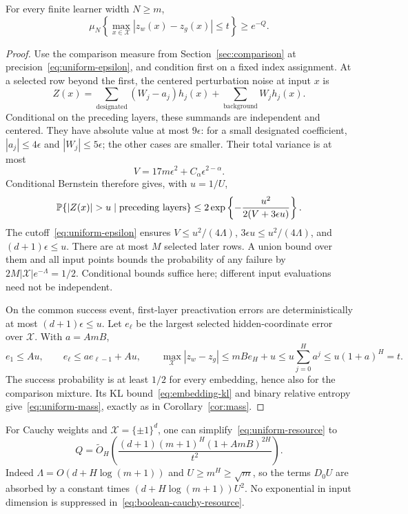 \begin{theorem}\label{thm:uniform-mass}
For every finite learner width $N\ge m$,
\begin{equation}
 \mu_N\left\{\max_{x\in\mathcal X}|z_w(x)-z_g(x)|\le t\right\}
 \ge e^{-Q}.
 \label{eq:uniform-mass}
\end{equation}
\end{theorem}
\begin{proof}
Use the comparison measure from Section~\ref{sec:comparison} at precision~\eqref{eq:uniform-epsilon}, and condition first on a fixed index assignment. At a selected row beyond the first, the centered perturbation noise at input $x$ is
\[
 Z(x)=\sum_{\mathrm{designated}}(W_j-a_j)h_j(x)
        +\sum_{\mathrm{background}}W_jh_j(x).
\]
Conditional on the preceding layers, these summands are independent and centered. They have absolute value at most $9\epsilon$: for a small designated coefficient, $|a_j|\le4\epsilon$ and $|W_j|\le5\epsilon$; the other cases are smaller. Their total variance is at most
\[
 V=17m\epsilon^2+C_\alpha\epsilon^{2-\alpha}.
\]
Conditional Bernstein therefore gives, with $u=1/U$,
\[
 \Pp\{|Z(x)|>u\mid\text{preceding layers}\}
 \le2\exp\left\{-\frac{u^2}{2(V+3\epsilon u)}\right\}.
\]
The cutoff~\eqref{eq:uniform-epsilon} ensures $V\le u^2/(4\Lambda)$, $3\epsilon u\le u^2/(4\Lambda)$, and $(d+1)\epsilon\le u$. There are at most $M$ selected later rows. A union bound over them and all input points bounds the probability of any failure by $2M|\mathcal X|e^{-\Lambda}=1/2$. Conditional bounds suffice here; different input evaluations need not be independent.

On the common success event, first-layer preactivation errors are deterministically at most $(d+1)\epsilon\le u$. Let $e_\ell$ be the largest selected hidden-coordinate error over $\mathcal X$. With $a=AmB$,
\[
 e_1\le Au,\qquad e_\ell\le ae_{\ell-1}+Au,\qquad
 \max_{\mathcal X}|z_w-z_g|\le mB e_H+u
 \le u\sum_{j=0}^H a^j\le u(1+a)^H=t.
\]
The success probability is at least $1/2$ for every embedding, hence also for the comparison mixture. Its KL bound~\eqref{eq:embedding-kl} and binary relative entropy give~\eqref{eq:uniform-mass}, exactly as in Corollary~\ref{cor:mass}.
\end{proof}

For Cauchy weights and $\mathcal X=\{\pm1\}^d$, one can simplify~\eqref{eq:uniform-resource} to
\begin{equation}
 Q=\widetilde O_H\left(
 \frac{(d+1)(m+1)^H(1+AmB)^{2H}}{t^2}\right).
 \label{eq:boolean-cauchy-resource}
\end{equation}
Indeed $\Lambda=O(d+H\log(m+1))$ and $U\ge m^H\ge\sqrt m$, so the terms $D_0U$ are absorbed by a constant times $(d+H\log(m+1))U^2$. No exponential in input dimension is suppressed in~\eqref{eq:boolean-cauchy-resource}.

